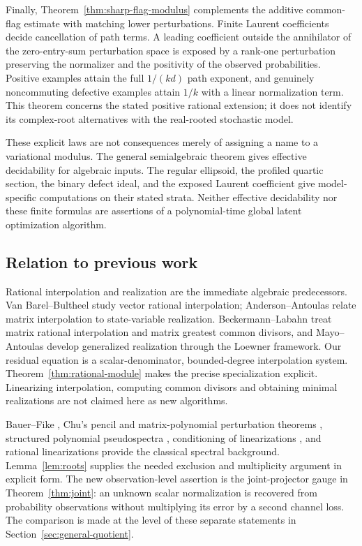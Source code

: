 \documentclass[11pt,reqno]{amsart}
\numberwithin{equation}{section}
\theoremstyle{definition}\newtheorem{definition}[theorem]{Definition}
\theoremstyle{remark}\newtheorem{remark}[theorem]{Remark}
\begin{document}
Finally, Theorem~\ref{thm:sharp-flag-modulus} complements the additive
common-flag estimate with matching lower perturbations. Finite Laurent
coefficients decide cancellation of path terms. A leading coefficient
outside the annihilator of the zero-entry-sum perturbation space is
exposed by a rank-one perturbation preserving the normalizer and the
positivity of the observed probabilities. Positive examples attain the
full $1/(kd)$ path exponent, and genuinely noncommuting defective
examples attain $1/k$ with a linear normalization term. This theorem
concerns the stated positive rational extension; it does not identify
its complex-root alternatives with the real-rooted stochastic model.

These explicit laws are not consequences merely of assigning a name
to a variational modulus. The general semialgebraic theorem gives
effective decidability for algebraic inputs. The regular ellipsoid,
the profiled quartic section, the binary defect ideal, and the exposed
Laurent coefficient give model-specific computations on their stated
strata. Neither effective decidability nor these finite formulas are
assertions of a polynomial-time global latent optimization algorithm.

\subsection{Relation to previous work}
Rational interpolation and realization are the immediate algebraic
predecessors. Van Barel--Bultheel \cite{VBB} study vector rational
interpolation; Anderson--Antoulas \cite{AA90} relate matrix interpolation
to state-variable realization. Beckermann--Labahn \cite{BL00} treat
matrix rational interpolation and matrix greatest common divisors, and
Mayo--Antoulas \cite{MA07} develop generalized realization through the
Loewner framework. Our residual equation is a scalar-denominator,
bounded-degree interpolation system. Theorem~\ref{thm:rational-module}
makes the precise specialization explicit. Linearizing interpolation,
computing common divisors and obtaining minimal realizations are not
claimed here as new algorithms.

Bauer--Fike \cite{BF}, Chu's pencil and matrix-polynomial perturbation
theorems \cite{Chu87,Chu03}, structured polynomial pseudospectra
\cite{TH}, conditioning of linearizations \cite{HMT}, and rational
linearizations \cite{SB} provide the classical spectral background.
Lemma~\ref{lem:roots} supplies the needed exclusion and multiplicity
argument in explicit form. The new observation-level assertion is the
joint-projector gauge in Theorem~\ref{thm:joint}: an unknown scalar
normalization is recovered from probability observations without
multiplying its error by a second channel loss. The comparison is made
at the level of these separate statements in
Section~\ref{sec:general-quotient}.
\end{document}
